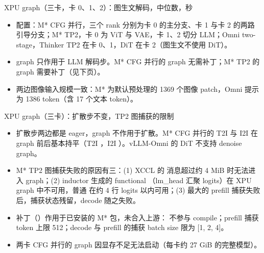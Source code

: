 
\begin{frame}[t]{XPU graph（三卡，卡 0、1、2）：图生文解码，中位数，秒}
\scriptsize\def\codesize{\relax}
\renewcommand{\arraystretch}{1.12}\setlength{\tabcolsep}{3pt}

\vspace{4pt}
\begin{itemize}\scriptsize\setlength\itemsep{1pt}
  \item 配置：M* CFG 并行，三个 rank 分别为卡 0 的主分支、卡 1 与卡 2 的两路引导分支；M* TP2，卡 0 为 ViT 与 VAE，卡 1、2 切分 LLM；Omni two-stage，Thinker TP2 在卡 0、1，DiT 在卡 2（图生文不使用 DiT）。
  \item graph 只作用于 LLM 解码步。M* CFG 并行的 graph 无需补丁；M* TP2 的 graph 需要补丁（见下页）。
  \item 两边图像输入规模一致：M* 为默认预处理的 1369 个图像 patch，Omni 提示为 1386 token（含 17 个文本 token）。
\end{itemize}
\end{frame}

\begin{frame}[t]{XPU graph（三卡）：扩散步不变，TP2 图捕获的限制}
\scriptsize\def\codesize{\relax}
\renewcommand{\arraystretch}{1.12}\setlength{\tabcolsep}{3pt}

\vspace{4pt}
\begin{itemize}\scriptsize\setlength\itemsep{1pt}
  \item 扩散步两边都是 eager，graph 不作用于扩散。M* CFG 并行的 T2I 与 I2I 在 graph 前后基本持平（T2I ，I2I ）。vLLM-Omni 的 DiT 不支持 denoise graph。
  \item M* TP2 图捕获失败的原因有三：(1) XCCL 的  消息超过约 4 MiB 时无法进入 graph；(2) inductor 生成的 functional （lm\_head 汇聚 logits）在 XPU graph 中不可用，普通  在约 4 行 logits 以内可用；(3) 最大的 prefill 捕获失败后，捕获状态残留，decode 随之失败。
  \item 补丁（）作用于已安装的 M* 包，未合入上游： 不参与 compile；prefill 捕获 token 上限 512；decode 与 prefill 的捕获 batch size 限为 [1, 2, 4]。
  \item 两卡 CFG 并行的 graph 因显存不足无法启动（每卡约 27 GiB 的完整模型）。
\end{itemize}
\end{frame}

